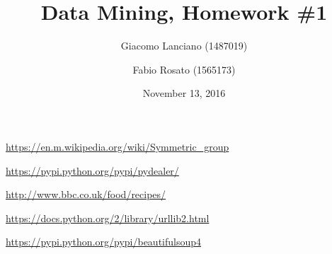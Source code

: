 \documentclass{article}
\title{Data Mining, Homework \#1}
\author{Giacomo Lanciano (1487019) \and Fabio Rosato (1565173)}
\date{November 13, 2016}
\begin{document}
\maketitle
\tableofcontents
{}

\newpage
{}


\newpage


\newpage


\newpage


\newpage
\begin{thebibliography}{9}
	
	\url{https://en.m.wikipedia.org/wiki/Symmetric_group}
	
	\url{https://pypi.python.org/pypi/pydealer/}
	
	\url{http://www.bbc.co.uk/food/recipes/}
	
	\url{https://docs.python.org/2/library/urllib2.html}
	
	\url{https://pypi.python.org/pypi/beautifulsoup4}
	
\end{thebibliography}
\end{document}
